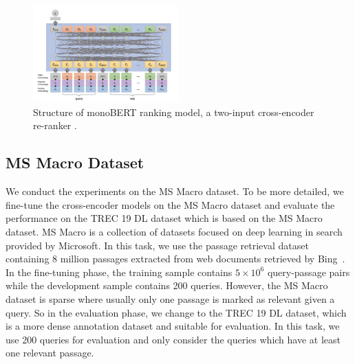 \documentclass[acmsmall]{acmart}
\begin{document}
\begin{figure}[!ht]
    \centering
    \includegraphics[width=0.5\textwidth]
    {cross-encoder.png}
    \caption{Structure of monoBERT ranking model, a two-input cross-encoder re-ranker \cite{lin2020pretrained}.}
    \label{fig:cross-encoder}
\end{figure}

\subsection{MS Macro Dataset}
We conduct the experiments on the MS Macro dataset. To be more detailed, we fine-tune the cross-encoder models on the MS Macro dataset and evaluate the performance on the TREC 19 DL dataset which is based on the MS Macro dataset. MS Macro is a collection of datasets focused on deep learning in search provided by Microsoft. In this task, we use the passage retrieval dataset containing 8 million passages extracted from web documents retrieved by Bing~\cite{msmarco}. In the fine-tuning phase, the training sample contains $5\times10^6$ query-passage pairs while the development sample contains 200 queries. However, the MS Macro dataset is sparse where usually only one passage is marked as relevant given a query. So in the evaluation phase, we change to the TREC 19 DL dataset,  which is a more dense annotation dataset and suitable for evaluation. In this task, we use 200 queries for evaluation and only consider the queries which have at least one relevant passage.
\end{document}
